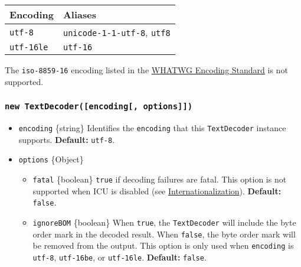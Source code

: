 \begin{longtable}[]{@{}ll@{}}
\toprule\noalign{}
Encoding & Aliases \\
\midrule\noalign{}
\endhead
\bottomrule\noalign{}
\endlastfoot
\texttt{\textquotesingle{}utf-8\textquotesingle{}} &
\texttt{\textquotesingle{}unicode-1-1-utf-8\textquotesingle{}},
\texttt{\textquotesingle{}utf8\textquotesingle{}} \\
\texttt{\textquotesingle{}utf-16le\textquotesingle{}} &
\texttt{\textquotesingle{}utf-16\textquotesingle{}} \\
\end{longtable}

The \texttt{\textquotesingle{}iso-8859-16\textquotesingle{}} encoding
listed in the \href{https://encoding.spec.whatwg.org/}{WHATWG Encoding
Standard} is not supported.

\subsubsection{\texorpdfstring{\texttt{new\ TextDecoder({[}encoding{[},\ options{]}{]})}}{new TextDecoder({[}encoding{[}, options{]}{]})}}\label{new-textdecoderencoding-options}

\begin{itemize}
\tightlist
\item
  \texttt{encoding} \{string\} Identifies the \texttt{encoding} that
  this \texttt{TextDecoder} instance supports. \textbf{Default:}
  \texttt{\textquotesingle{}utf-8\textquotesingle{}}.
\item
  \texttt{options} \{Object\}

  \begin{itemize}
  \tightlist
  \item
    \texttt{fatal} \{boolean\} \texttt{true} if decoding failures are
    fatal. This option is not supported when ICU is disabled (see
    \href{intl.md}{Internationalization}). \textbf{Default:}
    \texttt{false}.
  \item
    \texttt{ignoreBOM} \{boolean\} When \texttt{true}, the
    \texttt{TextDecoder} will include the byte order mark in the decoded
    result. When \texttt{false}, the byte order mark will be removed
    from the output. This option is only used when \texttt{encoding} is
    \texttt{\textquotesingle{}utf-8\textquotesingle{}},
    \texttt{\textquotesingle{}utf-16be\textquotesingle{}}, or
    \texttt{\textquotesingle{}utf-16le\textquotesingle{}}.
    \textbf{Default:} \texttt{false}.
  \end{itemize}
\end{itemize}

